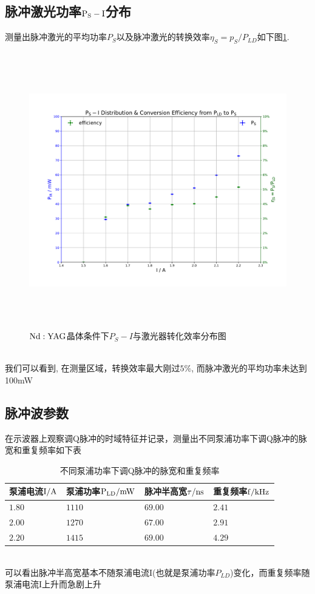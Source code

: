 \documentclass[a4paper]{article}
\begin{document}
\subsection{脉冲激光功率$\rm{P_S - I}$分布}\label{sub:dat}
测量出脉冲激光的平均功率$P_S$以及脉冲激光的转换效率$\eta_{S} = p_{S}/P_{LD}$如下图\ref{fig:fig4}. 
\begin{figure}[ht]
 \centering
 \includegraphics[height=12cm, width=16cm]{images/phyex4_fig.pdf}
 \caption{$\rm{Nd:YAG}$晶体条件下$P_{S}-I$与激光器转化效率分布图}
 \label{fig:fig4}
\end{figure}\\
我们可以看到, 在测量区域，转换效率最大刚过$5\%$, 而脉冲激光的平均功率未达到100mW
\newpage
\subsection{脉冲波参数}\label{sub:pulsewave}
在示波器上观察调Q脉冲的时域特征并记录，测量出不同泵浦功率下调Q脉冲的脉宽和重复频率如下表
\begin{table}[htp]
\caption{不同泵浦功率下调Q脉冲的脉宽和重复频率}\label{tab:signaldef}
\begin{center}
	\begin{tabular}{|l|l|l|p{6cm}|}
	\hline
	\textbf{泵浦电流$\rm I/A$} &\textbf{泵浦功率$\rm P_{LD}/mW$} & \textbf{脉冲半高宽$\rm \tau /ns$} & \textbf{重复频率$\rm f/kHz$}\\ \hline \hline
	$1.80$  & $1110$    & $69.00$ 	& $2.41$ \\ \hline
	$2.00$ 	& $1270$    & $67.00$   & $2.91$ \\ \hline
	$2.20$  & $1415$    & $69.00$   & $4.29$ \\ \hline
	\hline
	\end{tabular}
\end{center}
\end{table}\\
可以看出脉冲半高宽基本不随泵浦电流I(也就是泵浦功率$P_{LD}$)变化，而重复频率随泵浦电流I上升而急剧上升
\end{document}
